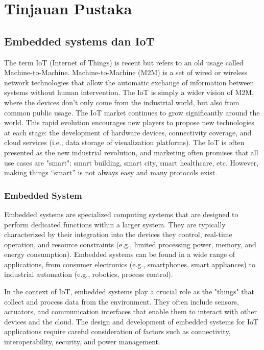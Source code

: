 \chapter{Tinjauan Pustaka}


\section{Embedded systems dan IoT}
The term IoT (Internet of Things) is recent but refers to an old usage called Machine-to-Machine.
Machine-to-Machine (M2M) is a set of wired or wireless network technologies that allow the
automatic exchange of information between systems without human intervention. The IoT is simply
a wider vision of M2M, where the devices don't only come from the industrial world, but also from
common public usage.
The IoT market continues to grow significantly around the world. This rapid evolution encourages
new players to propose new technologies at each stage: the development of hardware devices,
connectivity coverage, and cloud services (i.e., data storage of visualization platforms).
The IoT is often presented as the new industrial revolution, and marketing often promises that all
use cases are "smart": smart building, smart city, smart healthcare, etc. However, making things
“smart” is not always easy and many protocols exist.

\subsection{Embedded System}
Embedded systems are specialized computing systems that are designed to perform dedicated functions within a larger system. They are typically characterized by their integration into the devices they control, real-time operation, and resource constraints (e.g., limited processing power, memory, and energy consumption). Embedded systems can be found in a wide range of applications, from consumer electronics (e.g., smartphones, smart appliances) to industrial automation (e.g., robotics, process control).

In the context of IoT, embedded systems play a crucial role as the "things" that collect and process data from the environment. They often include sensors, actuators, and communication interfaces that enable them to interact with other devices and the cloud. The design and development of embedded systems for IoT applications require careful consideration of factors such as connectivity, interoperability, security, and power management.

